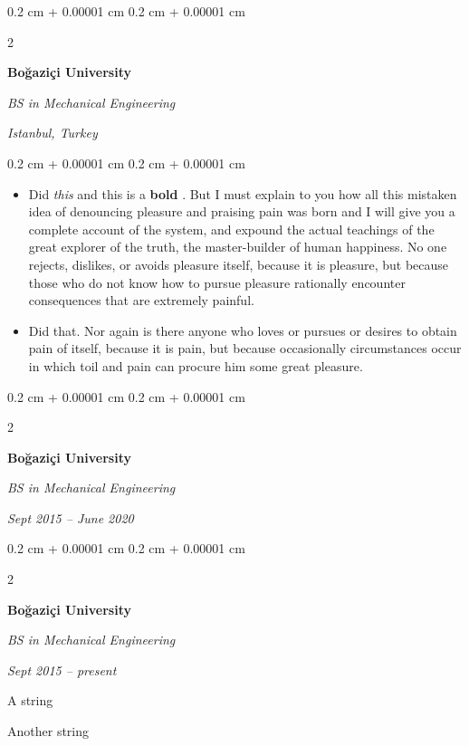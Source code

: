\documentclass[10pt, letterpaper]{article}
\newenvironment{summary}{
    \begin{description}[
        topsep=0.10 cm,
        parsep=0.10 cm,
        partopsep=0pt,
        itemsep=0pt,
        leftmargin=0.4 cm + 10pt
    ]
}{
    \end{description}
} %
\newenvironment{highlights}{
    \begin{itemize}[
        topsep=0.10 cm,
        parsep=0.10 cm,
        partopsep=0pt,
        itemsep=0pt,
        leftmargin=0.4 cm + 10pt
    ]
}{
    \end{itemize}
} %
\newenvironment{onecolentry}{
    \begin{adjustwidth}{
        0.2 cm + 0.00001 cm
    }{
        0.2 cm + 0.00001 cm
    }
}{
    \end{adjustwidth}
} %
\newenvironment{twocolentry}[2][]{
    \onecolentry
    \def\secondColumn{#2}
    \setcolumnwidth{\fill, 4.5 cm}
    \begin{paracol}{2}
}{
    \switchcolumn \raggedleft \secondColumn
    \end{paracol}
    \endonecolentry
} %
\let\hrefWithoutArrow\href
\renewcommand{\href}[2]{\hrefWithoutArrow{#1}{\ifthenelse{\equal{#2}{}}{ }{#2 }\raisebox{.15ex}{\footnotesize \faExternalLink*}}}
\begin{document}
        \begin{twocolentry}{
        \textit{Istanbul, Turkey}    
            
        }
            \textbf{Boğaziçi University}

            \textit{BS in Mechanical Engineering}
        \end{twocolentry}
        \vspace{0.10 cm}
        \begin{onecolentry}
            \begin{highlights}
                \item Did \textit{this} and this is a \textbf{bold} \href{https://example.com}{link}. But I must explain to you how all this mistaken idea of denouncing pleasure and praising pain was born and I will give you a complete account of the system, and expound the actual teachings of the great explorer of the truth, the master-builder of human happiness. No one rejects, dislikes, or avoids pleasure itself, because it is pleasure, but because those who do not know how to pursue pleasure rationally encounter consequences that are extremely painful.
                \item Did that. Nor again is there anyone who loves or pursues or desires to obtain pain of itself, because it is pain, but because occasionally circumstances occur in which toil and pain can procure him some great pleasure.
            \end{highlights}
        \end{onecolentry}


        \vspace{0.2 cm}

        \begin{twocolentry}{
            
            
        \textit{Sept 2015 – June 2020}}
            \textbf{Boğaziçi University}

            \textit{BS in Mechanical Engineering}
        \end{twocolentry}


        \vspace{0.2 cm}

        \begin{twocolentry}{
            
            
        \textit{Sept 2015 – present}}
            \textbf{Boğaziçi University}

            \textit{BS in Mechanical Engineering}
        \end{twocolentry}
            \begin{summary}
                \item A string
                \item Another string
            \end{summary}
\end{document}
